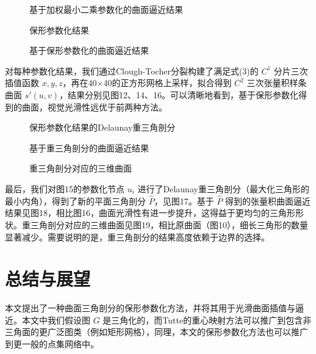 \documentclass{ctexart}
\theoremstyle{proof}
\begin{document}
\begin{figure}[htbp]
    \centering
    \caption{基于加权最小二乘参数化的曲面逼近结果}
    \label{fig:14}
\end{figure}

\begin{figure}[htbp]
    \centering
    \caption{保形参数化结果}
    \label{fig:15}
\end{figure}

\begin{figure}[htbp]
    \centering
    \caption{基于保形参数化的曲面逼近结果}
    \label{fig:16}
\end{figure}

对每种参数化结果，我们通过Clough-Tocher分裂\cite{farin1986,franke1986}构建了满足式(3)的 $C^1$ 分片三次插值函数 $x,y,z$，再在40×40的正方形网格上采样，拟合得到 $C^2$ 三次张量积样条曲面 $s'(u,v)$，结果分别见图12、14、16。可以清晰地看到，基于保形参数化得到的曲面，视觉光滑性远优于前两种方法。

\begin{figure}[htbp]
    \centering
    \caption{保形参数化结果的Delaunay重三角剖分}
    \label{fig:17}
\end{figure}

\begin{figure}[htbp]
    \centering
    \caption{基于重三角剖分的曲面逼近结果}
    \label{fig:18}
\end{figure}

\begin{figure}[htbp]
    \centering
    \caption{重三角剖分对应的三维曲面}
    \label{fig:19}
\end{figure}

最后，我们对图15的参数化节点 $u_i$ 进行了Delaunay重三角剖分（最大化三角形的最小内角），得到了新的平面三角剖分 $\hat{P}$，见图17。基于 $\hat{P}$ 得到的张量积曲面逼近结果见图18，相比图16，曲面光滑性有进一步提升，这得益于更均匀的三角形形状。重三角剖分对应的三维曲面见图19，相比原曲面（图10），细长三角形的数量显著减少。需要说明的是，重三角剖分的结果高度依赖于边界的选择。

\section{总结与展望}
本文提出了一种曲面三角剖分的保形参数化方法，并将其用于光滑曲面插值与逼近。本文中我们假设图 $G$ 是三角化的，而Tutte的重心映射方法可以推广到包含非三角面的更广泛图类（例如矩形网格），同理，本文的保形参数化方法也可以推广到更一般的点集网络中。
\end{document}
